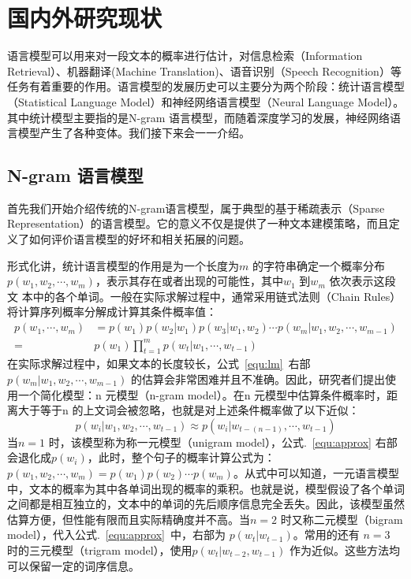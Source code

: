 \section{国内外研究现状}
语言模型可以用来对一段文本的概率进行估计，对信息检索（Information Retrieval）、机器翻译(Machine Translation)、语音识别（Speech Recognition）等任务有着重要的作用。语言模型的发展历史可以主要分为两个阶段：统计语言模型（Statistical Language Model）和神经网络语言模型（Neural Language Model）。其中统计模型主要指的是N-gram 语言模型，而随着深度学习的发展，神经网络语言模型产生了各种变体。我们接下来会一一介绍。

\subsection{N-gram 语言模型}
首先我们开始介绍传统的N-gram语言模型，属于典型的基于稀疏表示（Sparse Representation）的语言模型。它的意义不仅是提供了一种文本建模策略，而且定义了如何评价语言模型的好坏和相关拓展的问题。

形式化讲，统计语言模型的作用是为一个长度为$m$ 的字符串确定一个概率分布$p(w_1,w_2,\cdots,w_m)$，表示其存在或者出现的可能性，其中$w_1$ 到$w_m$ 依次表示这段文
本中的各个单词。一般在实际求解过程中，通常采用链式法则（Chain Rules）将计算序列概率分解成计算其条件概率值：
\begin{equation}
\label{equ:lm}
\begin{split}
p(w_1,\cdots,w_m) &= p(w_1) p(w_2|w_1) p(w_3|w_1,w_2)\cdots p(w_m | w_1,w_2,\cdots,w_{m-1}) \\
=&p(w_1)\prod_{t=1}^{m}p(w_t|w_1,\cdots,w_{t-1})
\end{split}
\end{equation}
在实际求解过程中，如果文本的长度较长，公式~\ref{equ:lm}~右部$ p(w_m | w_1,w_2,\cdots,w_{m-1}) $ 的估算会非常困难并且不准确。因此，研究者们提出使用一个简化模型：n 元模型（n-gram model）。在n 元模型中估算条件概率时，距离大于等于n 的上文词会被忽略，也就是对上述条件概率做了以下近似：
\begin{equation}
\label{equ:approx}
p(w_i | w_1,w_2,\cdots,w_{t-1})  \approx p(w_i | w_{t-(n-1)},\cdots,w_{t-1})
\end{equation}
当$n = 1$ 时，该模型称为称一元模型（unigram model），公式.~\ref{equ:approx} 右部会退化成$p(w_i)$，此时，整个句子的概率计算公式为：$p(w_1,w_2,\cdots,w_m) = p(w_1)p(w_2) \cdots p(w_m)$。从式中可以知道，一元语言模型中，文本的概率为其中各单词出现的概率的乘积。也就是说，模型假设了各个单词之间都是相互独立的，文本中的单词的先后顺序信息完全丢失。因此，该模型虽然估算方便，但性能有限而且实际精确度并不高。当$n = 2$ 时又称二元模型（bigram model），代入公式.~\ref{equ:approx}~中，右部为 $p(w_t|w_{t-1})$。常用的还有 $n = 3$ 时的三元模型（trigram model），使用$p(w_t |w_{t-2},w_{t-1})$ 作为近似。这些方法均可以保留一定的词序信息。

